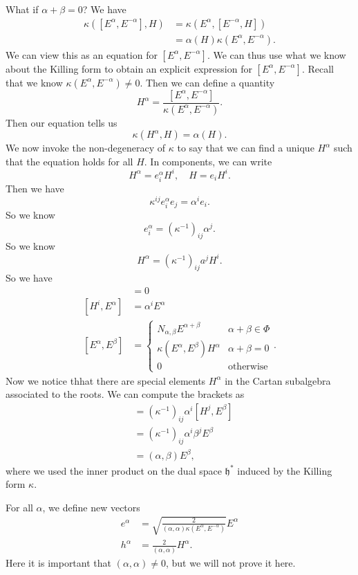 \documentclass[a4paper]{article}
\begin{document}
What if $\alpha + \beta = 0$? We have
\begin{align*}
  \kappa([E^\alpha, E^{-\alpha}], H) &= \kappa(E^\alpha, [E^{-\alpha}, H])\\
  &= \alpha(H) \kappa(E^\alpha, E^{-\alpha}).
\end{align*}
We can view this as an equation for $[E^\alpha, E^{-\alpha}]$. We can thus use what we know about the Killing form to obtain an explicit expression for $[E^\alpha, E^{-\alpha}]$. Recall that we know $\kappa(E^\alpha, E^{-\alpha}) \not= 0$. Then we can define a quantity
\[
  H^\alpha = \frac{[E^\alpha, E^{-\alpha}]}{\kappa(E^\alpha, E^{-\alpha})}.
\]
Then our equation tells us
\[
  \kappa(H^\alpha, H) = \alpha(H).
\]
We now invoke the non-degeneracy of $\kappa$ to say that we can find a unique $H^\alpha$ such that the equation holds for all $H$. In components, we can write
\[
  H^\alpha = e_i^\alpha H^i,\quad H = e_i H^i.
\]
Then we have
\[
  \kappa^{ij}e^\alpha_i e_j = \alpha^i e_i.
\]
So we know
\[
  e^\alpha_i = (\kappa^{-1})_{ij} \alpha^j.
\]
So we know
\[
  H^\alpha = (\kappa^{-1})_{ij} a^j H^i.
\]
So we have
\begin{align*}
  [H^i, H^j] &= 0\\
  [H^i, E^\alpha] &= \alpha^i E^\alpha\\
  [E^\alpha, E^\beta] &=
  \begin{cases}
    N_{\alpha, \beta}E^{\alpha + \beta} & \alpha + \beta \in \Phi\\
    \kappa(E^\alpha, E^\beta) H^\alpha & \alpha + \beta = 0\\
    0 & \text{otherwise}
  \end{cases}.
\end{align*}
Now we notice thhat there are special elements $H^\alpha$ in the Cartan subalgebra associated to the roots. We can compute the brackets as
\begin{align*}
  [H^\alpha, E^\beta] &= (\kappa^{-1})_{ij} \alpha^i [H^j, E^\beta]\\
  &= (\kappa^{-1})_{ij}\alpha^i \beta^j E^\beta\\
  &= (\alpha, \beta) E^\beta,
\end{align*}
where we used the inner product on the dual space $\mathfrak{h}^*$ induced by the Killing form $\kappa$.

For all $\alpha$, we define new vectors
\begin{align*}
  e^\alpha &= \sqrt{\frac{2}{(\alpha, \alpha) \kappa(E^\alpha, E^{-\alpha})}} E^\alpha\\
  h^\alpha &= \frac{2}{(\alpha, \alpha)} H^\alpha.
\end{align*}
Here it is important that $(\alpha, \alpha) \not= 0$, but we will not prove it here.
\end{document}
